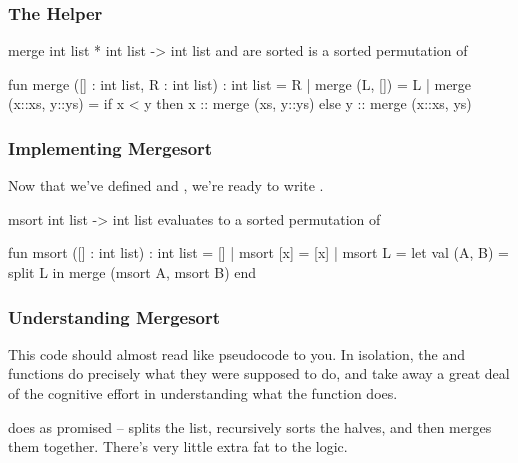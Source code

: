 \documentclass[aspectratio=169]{beamer}
\begin{document}
\begin{frame}[fragile]
  \frametitle{The  Helper}

  \spec
    {merge}
    {int list * int list -> int list}
    { and  are sorted}
    { is a sorted permutation of }

  \pause
  \vspace{\fill}

  \begin{codeblock}
    fun merge ([] : int list, R : int list) : int list = R
      | merge (L, []) = L
      | merge (x::xs, y::ys) =
          if x < y then
            x :: merge (xs, y::ys)
          else
            y :: merge (x::xs, ys)
  \end{codeblock}
\end{frame}

\begin{frame}[fragile]
  \frametitle{Implementing Mergesort}

  Now that we've defined  and , we're ready to write .

  \pause
  \vspace{\fill}

  \spec
    {msort}
    {int list -> int list}
    {}
    { evaluates to a sorted permutation of }

  \pause
  \vspace{\fill}

  \begin{codeblock}
    fun msort ([] : int list) : int list = []
      | msort [x] = [x]
      | msort L =
          let
            val (A, B) = split L
          in
            merge (msort A, msort B)
          end
  \end{codeblock}
\end{frame}

\begin{frame}[fragile]
  \frametitle{Understanding Mergesort}

  \rprs

  This code should almost read like pseudocode to you. In isolation, the
   and  functions do precisely what they were supposed
  to do, and take away a great deal of the cognitive effort in understanding
  what the  function does.

  \pause
  \vspace{\fill}

   does as promised -- splits the list, recursively sorts the
  halves, and then merges them together. There's very little extra fat to the
  logic.

  \pause
  \vspace{\fill}

\end{frame}
\end{document}
